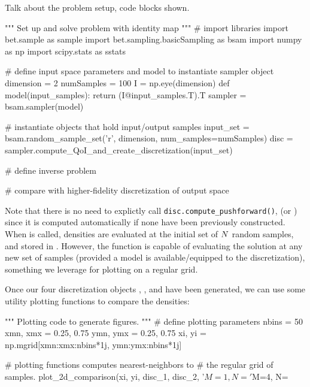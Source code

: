 
Talk about the problem setup, code blocks shown.

\begin{python}
"""
Set up and solve problem with identity map
"""
# import libraries
import bet.sample as sample
import bet.sampling.basicSampling as bsam
import numpy as np
import scipy.stats as sstats

# define input space parameters and model to instantiate sampler object
dimension = 2
numSamples = 100
I = np.eye(dimension)
def model(input_samples):
        return (I@input_samples.T).T
sampler = bsam.sampler(model)

# instantiate objects that hold input/output samples
input_set = bsam.random_sample_set('r', dimension, num_samples=numSamples)
disc = sampler.compute_QoI_and_create_discretization(input_set)

# define inverse problem

# compare with higher-fidelity discretization of output space

\end{python}

Note that there is no need to explictly call {\tt disc.compute\_pushforward()}, (or ) since it is computed automatically if none have been previously constructed.
When  is called, densities are evaluated at the initial set of $N$ random samples, and stored in .
However, the function  is capable of evaluating the solution at any new set of samples (provided a model is available/equipped to the discretization), something we leverage for plotting on a regular grid.

Once our four discretization objects , ,  and  have been generated, we can use some utility plotting functions to compare the densities:

\begin{python}
"""
Plotting code to generate figures.
"""
# define plotting parameters
nbins = 50
xmn, xmx = 0.25, 0.75
ymn, ymx = 0.25, 0.75
xi, yi = np.mgrid[xmn:xmx:nbins*1j, ymn:ymx:nbins*1j]

# plotting functions computes nearest-neighbors to
# the regular grid of samples.
plot_2d_comparison(xi, yi, disc_1, disc_2,
                   '$M=1, N=%
                   '$M=4, N=%
\end{python}

